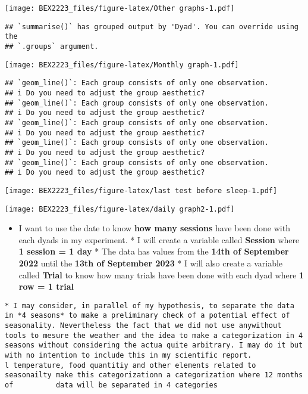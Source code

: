 \documentclass[
]{article}
\providecommand{\tightlist}{%
  \setlength{\itemsep}{0pt}\setlength{\parskip}{0pt}}
\begin{document}
\texttt{[image: BEX2223\_files/figure-latex/Other graphs-1.pdf]}

\begin{verbatim}
## `summarise()` has grouped output by 'Dyad'. You can override using the
## `.groups` argument.
\end{verbatim}

\texttt{[image: BEX2223\_files/figure-latex/Monthly graph-1.pdf]}

\begin{verbatim}
## `geom_line()`: Each group consists of only one observation.
## i Do you need to adjust the group aesthetic?
## `geom_line()`: Each group consists of only one observation.
## i Do you need to adjust the group aesthetic?
## `geom_line()`: Each group consists of only one observation.
## i Do you need to adjust the group aesthetic?
## `geom_line()`: Each group consists of only one observation.
## i Do you need to adjust the group aesthetic?
## `geom_line()`: Each group consists of only one observation.
## i Do you need to adjust the group aesthetic?
\end{verbatim}

\texttt{[image: BEX2223\_files/figure-latex/last test before sleep-1.pdf]}

\texttt{[image: BEX2223\_files/figure-latex/daily graph2-1.pdf]}

\begin{itemize}
\tightlist
\item
  I want to use the date to know \textbf{how many sessions} have been
  done with each dyads in my experiment. * I will create a variable
  called \textbf{Session} where \textbf{1 session = 1 day} * The data
  has values from the \textbf{14th of September 2022} until the
  \textbf{13th of September 2023} * I will also create a variable called
  \textbf{Trial} to know how many trials have been done with each dyad
  where \textbf{1 row = 1 trial}
\end{itemize}

\begin{verbatim}
* I may consider, in parallel of my hypothesis, to separate the data in *4 seasons* to make a preliminary check of a potential effect of seasonality. Nevertheless the fact that we did not use anywithout      tools to mesure the weather and the idea to make a categorization in 4 seasons without considering the actua quite arbitrary. I may do it but with no intention to include this in my scientific report.
l temperature, food quantitiy and other elements related to seasonailty make this categorizationn a categorization where 12 months of          data will be separated in 4 categories
\end{verbatim}
\end{document}
